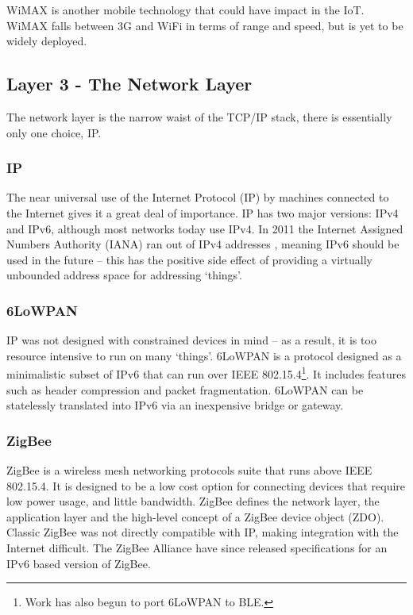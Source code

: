 \documentclass[10pt,journal,compsoc]{IEEEtran}
\begin{document}
WiMAX is another mobile technology that could have impact in the IoT. WiMAX
falls between 3G and WiFi in terms of range and speed, but is yet to be widely
deployed.  

\subsection{Layer 3 - The Network Layer}
The network layer is the narrow waist of the TCP/IP stack, there is essentially
only one choice, IP. 

\subsubsection{IP}
The near universal use of the Internet Protocol (IP) by machines connected to
the Internet gives it a great deal of importance. IP has two major versions:
IPv4 and IPv6, although most networks today use IPv4. In 2011 the Internet
Assigned Numbers Authority (IANA) ran out of IPv4 addresses \cite{Potaroo},
meaning IPv6 should be used in the future -- this has the positive side effect
of providing a virtually unbounded address space for addressing `things'. 

\subsubsection{6LoWPAN}
IP was not designed with constrained devices in mind -- as a result, it is too
resource intensive to run on many `things'. 6LoWPAN is a protocol designed as a
minimalistic subset of IPv6 that can run over IEEE 802.15.4\footnote{Work has
also begun to port 6LoWPAN to BLE.}. It includes features such as header
compression and packet fragmentation. 6LoWPAN can be statelessly translated
into IPv6 via an inexpensive bridge or gateway. 

\subsubsection{ZigBee}
ZigBee is a wireless mesh networking protocols suite that runs above IEEE
802.15.4. It is designed to be a low cost option for connecting devices that
require low power usage, and little bandwidth. ZigBee defines the network
layer, the application layer and the high-level concept of a ZigBee device
object (ZDO). Classic ZigBee was not directly compatible with IP, making
integration with the Internet difficult. The ZigBee Alliance have since
released specifications for an IPv6 based version of ZigBee.
\end{document}
